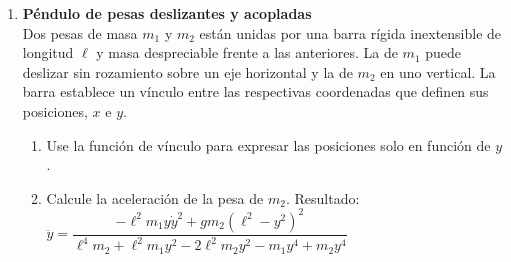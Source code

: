 \documentclass[11pt, spanish, a4paper, twoside]{article}
\begin{document}
\begin{enumerate}
	\item 
	\begin{minipage}[t][2.3cm]{0.75\textwidth}
		\textbf{Péndulo de pesas deslizantes y acopladas}\\ 
		Dos pesas de masa \(m_1\) y \(m_2\) están unidas por una barra rígida inextensible de longitud \(\ell\) y masa despreciable frente a las anteriores.
		La de \(m_1\) puede deslizar sin rozamiento sobre un eje horizontal y la de \(m_2\) en uno vertical.
		La barra establece un vínculo entre las respectivas coordenadas que definen sus posiciones, \(x\) e \(y\).
	\end{minipage}
	\begin{minipage}[c][1cm][t]{0.25\textwidth}
		
	\end{minipage}
	\begin{enumerate}
		\item Use la función de vínculo para expresar las posiciones solo en función de \(y\).
		\item Calcule la aceleración de la pesa de \(m_2\). %
		Resultado:
			$\ddot{y} = 
			\dfrac{- \ell^{2} m_{1} y \dot{y}^{2} + g m_{2} \left(\ell^{2} - y^{2}\right)^{2}}{\ell^{4} m_{2} + \ell^{2} m_{1} y^{2} - 2 \ell^{2} m_{2} y^{2} - m_{1} y^{4} + m_{2} y^{4}}$
			\qquad
	\end{enumerate}
	


\end{enumerate}
\end{document}
